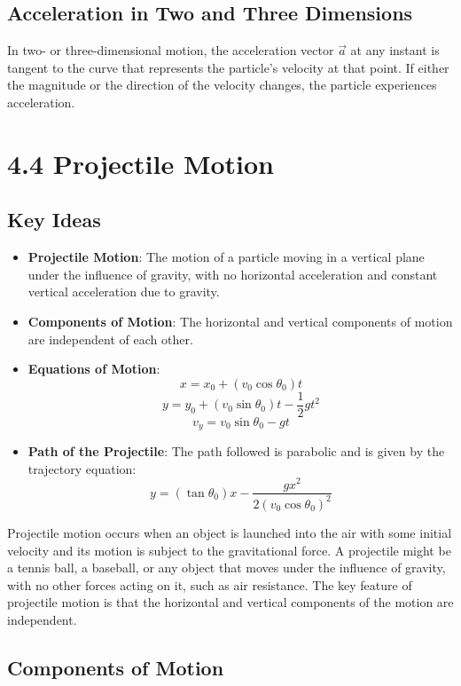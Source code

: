 \documentclass{article}
\begin{document}
\subsection*{Acceleration in Two and Three Dimensions}
In two- or three-dimensional motion, the acceleration vector $\vec{a}$ at any instant is tangent to the curve that represents the particle's velocity at that point. If either the magnitude or the direction of the velocity changes, the particle experiences acceleration.

\section*{4.4 Projectile Motion}
\subsection*{Key Ideas}
\begin{itemize}
    \item \textbf{Projectile Motion}: The motion of a particle moving in a vertical plane under the influence of gravity, with no horizontal acceleration and constant vertical acceleration due to gravity.
    \item \textbf{Components of Motion}: The horizontal and vertical components of motion are independent of each other.
    \item \textbf{Equations of Motion}:
    \[
    x = x_0 + (v_0 \cos \theta_0)t
    \]
    \[
    y = y_0 + (v_0 \sin \theta_0)t - \frac{1}{2} g t^2
    \]
    \[
    v_y = v_0 \sin \theta_0 - g t
    \]
    \item \textbf{Path of the Projectile}: The path followed is parabolic and is given by the trajectory equation:
    \[
    y = ( \tan \theta_0 ) x - \frac{g x^2}{2 (v_0 \cos \theta_0)^2}
    \]
\end{itemize}
Projectile motion occurs when an object is launched into the air with some initial velocity and its motion is subject to the gravitational force. A projectile might be a tennis ball, a baseball, or any object that moves under the influence of gravity, with no other forces acting on it, such as air resistance. The key feature of projectile motion is that the horizontal and vertical components of the motion are independent.

\subsection*{Components of Motion}
\end{document}
